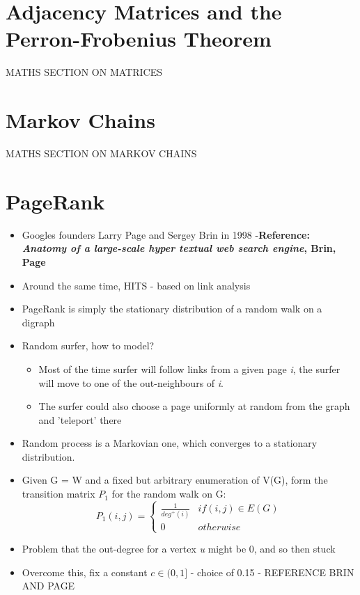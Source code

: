 \documentclass[11pt]{report}
\begin{document}
\section{Adjacency Matrices and the Perron-Frobenius Theorem}
MATHS SECTION ON MATRICES
\section{Markov Chains}
MATHS SECTION ON MARKOV CHAINS
\section{PageRank}
\begin{itemize}
\item Googles founders Larry Page and Sergey Brin in 1998 -\textbf{Reference: \textit{Anatomy of a large-scale hyper textual web search engine}, Brin, Page}
\item Around the same time, HITS - based on link analysis
\item PageRank is simply the stationary distribution of a random walk on a digraph
\item Random surfer, how to model?
\begin{itemize}
\item Most of the time surfer will follow links from a given page \textit{i}, the surfer will move to one of the out-neighbours of \textit{i}. 
\item The surfer could also choose a page uniformly at random from the graph and 'teleport' there
\end{itemize}
\item Random process is a Markovian one, which converges to a stationary distribution.
\item Given G = W and a fixed but arbitrary enumeration of V(G), form the transition matrix $P_1$ for the random walk on G:
\begin{equation}
P_1(i,j) = \begin{cases} \frac{1}{deg^+(i)} & if (i,j) \in E(G) \\ 0 & otherwise\end{cases}
\end{equation}
\item Problem that the out-degree for a vertex \textit{u} might be 0, and so then stuck
\item Overcome this, fix a constant \(c \in (0,1] \) - choice of 0.15 - REFERENCE BRIN AND PAGE

\end{itemize}
\end{document}
